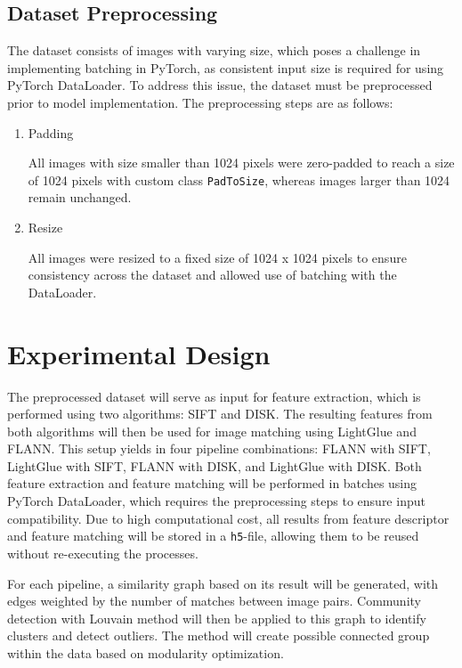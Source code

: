 \documentclass[report.tex]{subfiles}
\begin{document}
    \subsection{Dataset Preprocessing}
    The dataset consists of images with varying size, which poses a challenge in implementing batching in PyTorch, as consistent input size is required for using PyTorch DataLoader. To address this issue, the dataset must be preprocessed prior to model implementation. The preprocessing steps are as follows:

    \begin{enumerate}
        \item Padding
        
        All images with size smaller than 1024 pixels were zero-padded to reach a size of 1024 pixels with custom class \texttt{PadToSize}, whereas images larger than 1024 remain unchanged.
        \item Resize

        All images were resized to a fixed size of 1024 x 1024 pixels to ensure consistency across the dataset and allowed use of batching with the DataLoader.
    \end{enumerate}


    \section{Experimental Design}
    The preprocessed dataset will serve as input for feature extraction, which is performed using two algorithms: SIFT and DISK. The resulting features from both algorithms will then be used for image matching using LightGlue and FLANN. This setup yields in four pipeline combinations: FLANN with SIFT, LightGlue with SIFT, FLANN with DISK, and LightGlue with DISK. Both feature extraction and feature matching will be performed in batches using PyTorch DataLoader, which requires the preprocessing steps to ensure input compatibility. Due to high computational cost, all results from feature descriptor and feature matching will be stored in a \texttt{h5}-file, allowing them to be reused without re-executing the processes.

    For each pipeline, a similarity graph based on its result will be generated, with edges weighted by the number of matches between image pairs. Community detection with Louvain method \cite{Blondel_2008} will then be applied to this graph to identify clusters and detect outliers. The method will create possible connected group within the data based on modularity optimization.
\end{document}

